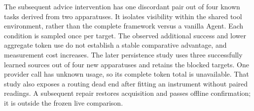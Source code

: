 \documentclass[twoside,11pt]{article}
\begin{document}
The subsequent advice intervention has one discordant pair out of four known
tasks derived from two apparatuses. It isolates visibility within the shared
tool environment, rather than the complete framework versus a vanilla Agent.
Each condition is sampled once per target. The observed additional success and
lower aggregate token use do not establish a stable comparative advantage, and
measurement cost increases. The later persistence study uses three successfully
learned sources out of four new apparatuses and retains the blocked targets.
One provider call has unknown usage, so its complete token total is unavailable.
That study also exposes a routing dead end after fitting an instrument without
paired readings. A subsequent repair restores acquisition and passes offline
confirmation; it is outside the frozen live comparison.
\end{document}
